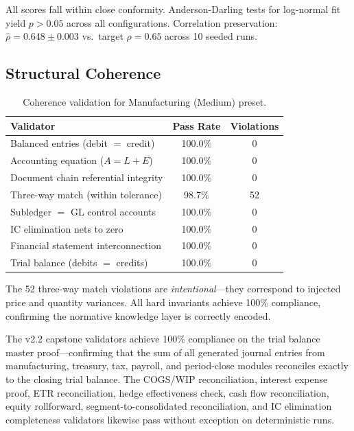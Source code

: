 All scores fall within close conformity.  Anderson-Darling tests for
log-normal fit yield $p > 0.05$ across all configurations.  Correlation
preservation: $\hat{\rho} = 0.648 \pm 0.003$ vs.\ target $\rho = 0.65$
across 10 seeded runs.

\subsection{Structural Coherence}
\label{sec:exp_coherence}

\begin{table}[t]
\centering
\caption{Coherence validation for Manufacturing (Medium) preset.}
\label{tab:coherence_results}
\small
\begin{tabular}{lcc}
\toprule
\textbf{Validator} & \textbf{Pass Rate} & \textbf{Violations} \\
\midrule
Balanced entries (debit $=$ credit)   & 100.0\% & 0 \\
Accounting equation ($A = L + E$)     & 100.0\% & 0 \\
Document chain referential integrity  & 100.0\% & 0 \\
Three-way match (within tolerance)    & 98.7\%  & 52 \\
Subledger $=$ GL control accounts     & 100.0\% & 0 \\
IC elimination nets to zero           & 100.0\% & 0 \\
Financial statement interconnection   & 100.0\% & 0 \\
Trial balance (debits $=$ credits)    & 100.0\% & 0 \\
\bottomrule
\end{tabular}
\end{table}

The 52 three-way match violations are \emph{intentional}---they
correspond to injected price and quantity variances.  All hard
invariants achieve 100\% compliance, confirming the normative
knowledge layer is correctly encoded.

The v2.2 capstone validators achieve 100\% compliance on the trial
balance master proof---confirming that the sum of all generated journal
entries from manufacturing, treasury, tax, payroll, and period-close
modules reconciles exactly to the closing trial balance.  The COGS/WIP
reconciliation, interest expense proof, ETR reconciliation, hedge
effectiveness check, cash flow reconciliation, equity rollforward,
segment-to-consolidated reconciliation, and IC elimination completeness
validators likewise pass without exception on deterministic runs.

